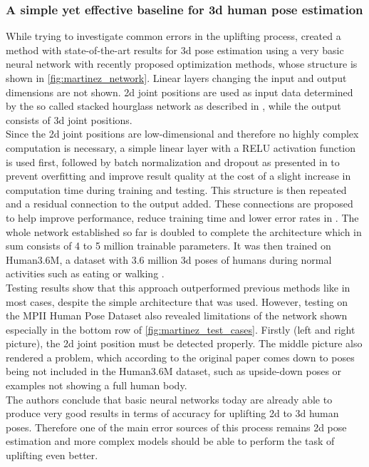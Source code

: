 \subsubsection{A simple yet effective baseline for 3d human pose estimation}
While trying to investigate common errors in the uplifting process, \cite{Martinez_2017_ICCV} created a method with state-of-the-art results for 3d pose estimation using a very basic neural network with recently proposed optimization methods, whose structure is shown in \autoref{fig:martinez_network}. Linear layers changing the input and output dimensions are not shown. 2d joint positions are used as input data determined by the so called stacked hourglass network as described in \cite{Newell2016}, while the output consists of 3d joint positions.\\
 Since the 2d joint positions are low-dimensional and therefore no highly complex computation is necessary, a simple linear layer with a RELU activation function is used first, followed by batch normalization and dropout as presented in \cite{srivastava2014} to prevent overfitting and improve result quality at the cost of a slight increase in computation time during training and testing. This structure is then repeated and a residual connection to the output added. These connections are proposed to help improve performance, reduce training time and lower error rates in \cite{HeZRS15}. The whole network established so far is doubled to complete the architecture which in sum consists of 4 to 5 million trainable parameters. It was then trained on Human3.6M, a dataset with 3.6 million 3d poses of humans during normal activities such as eating or walking \cite{H3.6M}.\\ Testing results show that this approach outperformed previous methods like \cite{PavlakosZDD16} in most cases, despite the simple architecture that was used. However, testing on the MPII Human Pose Dataset \cite{andriluka14cvpr} also revealed limitations of the network shown especially in the bottom row of \autoref{fig:martinez_test_cases}. Firstly (left and right picture), the 2d joint position must be detected properly. The middle picture also rendered a problem, which according to the original paper comes down to poses being not included in the Human3.6M dataset, such as upside-down poses or examples not showing a full human body.\\
 The authors conclude that basic neural networks today are already able to produce very good results in terms of accuracy for uplifting 2d to 3d human poses. Therefore one of the main error sources of this process remains 2d pose estimation and more complex models should be able to perform the task of uplifting even better.
 
